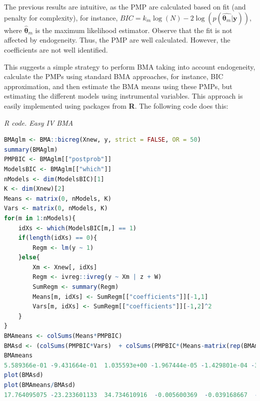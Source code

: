 \begin{enumerate}[leftmargin=*]
The previous results are intuitive, as the PMP are calculated based on fit (and penalty for complexity), for instance, $BIC=k_m\log(N)-2\log(p(\hat{\bm{\theta}_m}|\bm{y}))$, where $\hat{\bm{\theta}}_m$ is the maximum likelihood estimator. Observe that the fit is not affected by endogeneity. Thus, the PMP are well calculated. However, the coefficients are not well identified.  

This suggests a simple strategy to perform BMA taking into account endogeneity, calculate the PMPs using standard BMA approaches, for instance, BIC approximation, and then estimate the BMA means using these PMPs, but estimating the different models using instrumental variables. This approach is easily implemented using packages from \textbf{R}. The following code does this:

\begin{tcolorbox}[enhanced,width=4.67in,center upper,
	fontupper=\large\bfseries,drop shadow southwest,sharp corners]
	\textit{R code. Easy IV BMA}
	\begin{VF}
		\begin{lstlisting}[language=R]
BMAglm <- BMA::bicreg(Xnew, y, strict = FALSE, OR = 50) 
summary(BMAglm)
PMPBIC <- BMAglm[["postprob"]]
ModelsBIC <- BMAglm[["which"]]
nModels <- dim(ModelsBIC)[1]
K <- dim(Xnew)[2]
Means <- matrix(0, nModels, K)
Vars <- matrix(0, nModels, K)
for(m in 1:nModels){
	idXs <- which(ModelsBIC[m,] == 1)
	if(length(idXs) == 0){
		Regm <- lm(y ~ 1)
	}else{
		Xm <- Xnew[, idXs]
		Regm <- ivreg::ivreg(y ~ Xm | z + W)
		SumRegm <- summary(Regm)
		Means[m, idXs] <- SumRegm[["coefficients"]][-1,1]
		Vars[m, idXs] <- SumRegm[["coefficients"]][-1,2]^2 
	}
}
BMAmeans <- colSums(Means*PMPBIC)
BMAsd <- (colSums(PMPBIC*Vars)  + colSums(PMPBIC*(Means-matrix(rep(BMAmeans, each = nModels), nModels, K))^2))^0.5 
BMAmeans
5.589366e-01 -9.431664e-01  1.035593e+00 -1.967444e-05 -1.429801e-04 -3.310215e-04  4.036846e-04 4.651796e-03 -2.673730e-03  6.462503e-05  4.286529e-04 -1.829889e-04  5.073229e-03 -1.007356e-04 -5.377972e-04  1.644475e-03 -4.029205e-04 -1.457381e-04  6.421582e-04  2.211994e-04  2.216503e-04
plot(BMAsd)
plot(BMAmeans/BMAsd)
17.764095075 -23.233601133  34.734610916  -0.005600369  -0.039168667  -0.071895067   0.080909448 0.274994618  -0.210854131   0.018790592   0.061271650  -0.047117887   0.305639285  -0.028830411 -0.092463544   0.169455952  -0.058299940  -0.038099792   0.102373567   0.056074670   0.055500343
		\end{lstlisting}
	\end{VF}
\end{tcolorbox} 


\end{enumerate}
